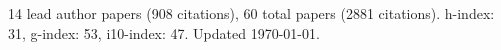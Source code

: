 14 lead author papers (908 citations),
60 total papers (2881 citations).\newline
h-index: 31, g-index: 53, i10-index: 47. Updated \today.